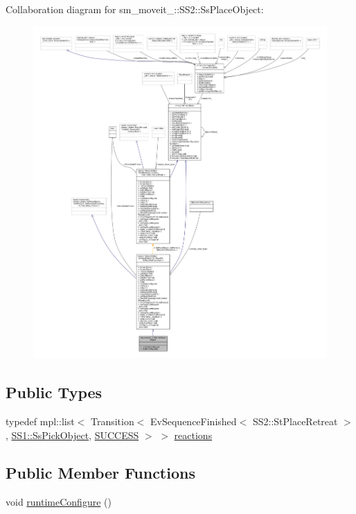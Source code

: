 Collaboration diagram for sm\+\_\+moveit\+\_\+:\+:S\+S2\+:\+:Ss\+Place\+Object\+:
\nopagebreak
\begin{figure}[H]
\begin{center}
\leavevmode
\includegraphics[width=350pt]{structsm__moveit__3_1_1SS2_1_1SsPlaceObject__coll__graph}
\end{center}
\end{figure}
\subsection*{Public Types}
\begin{DoxyCompactItemize}
\item 
typedef mpl\+::list$<$ Transition$<$ Ev\+Sequence\+Finished$<$ S\+S2\+::\+St\+Place\+Retreat $>$, \hyperlink{structsm__moveit__3_1_1SS1_1_1SsPickObject}{S\+S1\+::\+Ss\+Pick\+Object}, \hyperlink{classSUCCESS}{S\+U\+C\+C\+E\+SS} $>$ $>$ \hyperlink{structsm__moveit__3_1_1SS2_1_1SsPlaceObject_aa570aa6af4358579ad0e2356d835a9e1}{reactions}
\end{DoxyCompactItemize}
\subsection*{Public Member Functions}
\begin{DoxyCompactItemize}
\item 
void \hyperlink{structsm__moveit__3_1_1SS2_1_1SsPlaceObject_a3b7f50780b81fd0779daad7b765b4943}{runtime\+Configure} ()
\end{DoxyCompactItemize}
